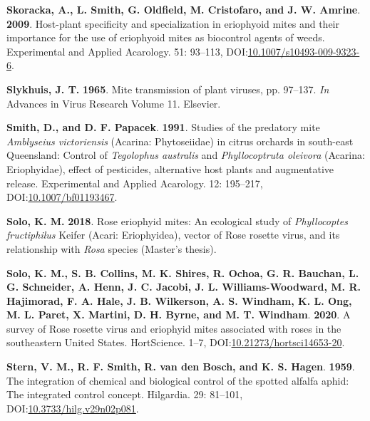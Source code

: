 \documentclass[12pt,final,CPage]{ufthesis}
\newlength{\cslhangindent}
\newenvironment{CSLReferences}[2] %
{%
	\setlength{\parindent}{0pt}
	\ifodd #1 \everypar{\setlength{\hangindent}{\cslhangindent}}\ignorespaces\fi
	\ifnum #2 > 0
	\setlength{\parskip}{#2\baselineskip}
	\fi
}%
{}
\begin{document}
{\begin{CSLReferences}{1}{0}
  \leavevmode{}%
  \textbf{Skoracka, A., L. Smith, G. Oldfield, M. Cristofaro, and J. W. Amrine}. \textbf{2009}. Host-plant specificity and specialization in eriophyoid mites and their importance for the use of eriophyoid mites as biocontrol agents of weeds. Experimental and Applied Acarology. 51: 93--113, DOI:\href{https://doi.org/10.1007/s10493-009-9323-6}{10.1007/s10493-009-9323-6}.

  \leavevmode{}%
  \textbf{Slykhuis, J. T.} \textbf{1965}. Mite transmission of plant viruses, pp. 97--137. \emph{In} Advances in Virus Research Volume 11. Elsevier.

  \leavevmode{}%
  \textbf{Smith, D., and D. F. Papacek}. \textbf{1991}. Studies of the predatory mite {\emph{Amblyseius victoriensis}} ({{Acarina}: {Phytoseiidae}}) in citrus orchards in south-east {Queensland}: Control of {\emph{Tegolophus australis}} and {\emph{Phyllocoptruta oleivora}} ({{Acarina}: {Eriophyidae}}), effect of pesticides, alternative host plants and augmentative release. Experimental and Applied Acarology. 12: 195--217, DOI:\href{https://doi.org/10.1007/bf01193467}{10.1007/bf01193467}.

  \leavevmode{}%
  \textbf{Solo, K. M.} \textbf{2018}. Rose eriophyid mites: An ecological study of {\emph{Phyllocoptes fructiphilus}} {Keifer} {({Acari}: {Eriophyidea})}, vector of {Rose rosette virus}, and its relationship with {\emph{Rosa}} species (Master's thesis).

  \leavevmode{}%
  \textbf{Solo, K. M., S. B. Collins, M. K. Shires, R. Ochoa, G. R. Bauchan, L. G. Schneider, A. Henn, J. C. Jacobi, J. L. Williams-Woodward, M. R. Hajimorad, F. A. Hale, J. B. Wilkerson, A. S. Windham, K. L. Ong, M. L. Paret, X. Martini, D. H. Byrne, and M. T. Windham}. \textbf{2020}. A survey of {Rose rosette virus} and eriophyid mites associated with roses in the southeastern {United States}. {HortScience}. 1--7, DOI:\href{https://doi.org/10.21273/hortsci14653-20}{10.21273/hortsci14653-20}.

  \leavevmode{}%
  \textbf{Stern, V. M., R. F. Smith, R. van den Bosch, and K. S. Hagen}. \textbf{1959}. The integration of chemical and biological control of the spotted alfalfa aphid: The integrated control concept. Hilgardia. 29: 81--101, DOI:\href{https://doi.org/10.3733/hilg.v29n02p081}{10.3733/hilg.v29n02p081}.


\end{CSLReferences}}
\end{document}
